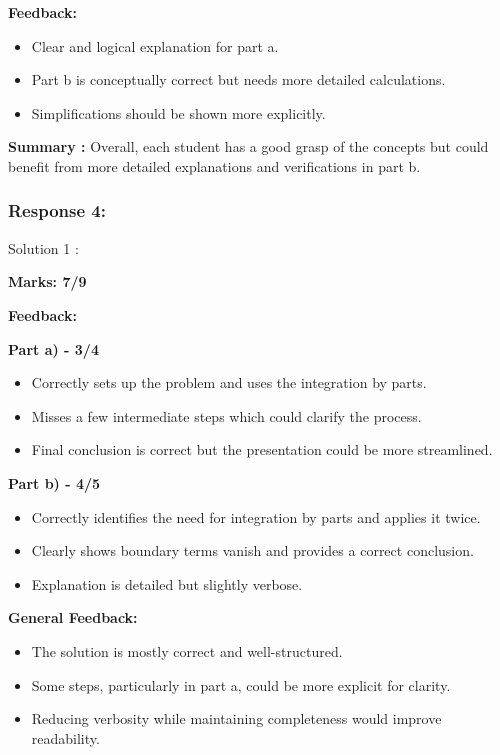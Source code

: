 \documentclass[a4paper,11pt]{article}
\begin{document}
\textbf{Feedback:}

\begin{itemize}
    \item Clear and logical explanation for part a.
    \item Part b is conceptually correct but needs more detailed calculations.
    \item Simplifications should be shown more explicitly.
\end{itemize}


\textbf{Summary :}
Overall, each student has a good grasp of the concepts but could benefit from more detailed explanations and verifications in part b.



\subsubsection*{Response 4:}

Solution 1 :

\textbf{Marks: 7/9}

\textbf{Feedback:}

\textbf{Part a) - 3/4}

\begin{itemize}
    \item Correctly sets up the problem and uses the integration by parts.
    \item Misses a few intermediate steps which could clarify the process.
    \item Final conclusion is correct but the presentation could be more streamlined.
\end{itemize}

\textbf{Part b) - 4/5}

\begin{itemize}
    \item Correctly identifies the need for integration by parts and applies it twice.
    \item Clearly shows boundary terms vanish and provides a correct conclusion.
    \item Explanation is detailed but slightly verbose.
\end{itemize}

\textbf{General Feedback:}

\begin{itemize}
    \item The solution is mostly correct and well-structured.
    \item Some steps, particularly in part a, could be more explicit for clarity.
    \item Reducing verbosity while maintaining completeness would improve readability.
\end{itemize}
\end{document}

